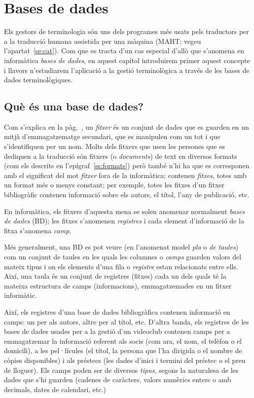 \chapter{Bases de dades}
\label{se:basesdades}

Els gestors de terminologia són uns dels programes més usats pels
traductors per a la traducció humana assistida per una màquina (MAHT;
vegeu l'apartat~\ref{se:cat}). Com que es tracta d'un cas especial
d'allò que s'anomena en informàtica \emph{bases de dades}, en aquest
capítol introduirem primer aquest concepte i llavors n'estudiarem
l'aplicació a la gestió terminològica a través de les bases de dades
terminològiques.


\section{Què és una base de dades?} 

Com s'explica en la pàg.~\pageref{pg:fitxer}, un \emph{fitxer} és un
conjunt de dades que es guarden en un mitjà d'emmagatzematge
secundari, que es manipulen com un tot i que s'identifiquen per un
nom. Molts dels fitxers que usen les persones que es dediquen a la
traducció són fitxers (o \emph{documents}) de text en diversos formats
(com els descrits en l'epígraf~\ref{ss:formats}) però també n'hi ha
que es corresponen amb el significat del mot \emph{fitxer} fora de la
informàtica: contenen \emph{fitxes}, totes amb un format més o menys
constant; per exemple, totes les fitxes d'un fitxer bibliogràfic
contenen informació sobre els autors, el títol, l'any de publicació,
etc.

En informàtica, els fitxers d'aquesta mena se solen anomenar
normalment \emph{bases de dades} (BD); les fitxes s'anomenen
\emph{registres} i cada element d'informació de la fitxa s'anomena
\emph{camp}.

Més generalment, una BD es pot veure (en l'anomenat model \emph{pla} o
\emph{de taules}) com un conjunt de taules en les quals les columnes o
\emph{camps} guarden valors del mateix tipus i on els elements d'una
fila o \emph{registre} estan relacionats entre ells. Així, una taula
és un conjunt de registres (fitxes) cada un dels quals té la mateixa
estructura de camps (informacions), emmagatzemades en un fitxer
informàtic.

Així, els registres d'una base de dades bibliogràfica contenen
informació en camps: un per als autors, altre per al títol,
etc. D'altra banda, els registres de les bases de dades usades per a
la gestió d'un videoclub contenen camps per a emmagatzemar la
informació referent als socis (com ara, el nom, el telèfon o el
domicili), a les pel·lícules (el títol, la persona que l'ha dirigida o
el nombre de còpies disponibles) i als préstecs (les dades d'inici i
termini del préstec o el preu de lloguer). Els camps poden ser de
diversos \emph{tipus}, segons la naturalesa de les dades que s'hi
guarden (cadenes de caràcters, valors numèrics enters o amb decimals,
dates de calendari, etc.)

